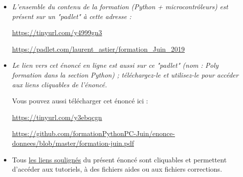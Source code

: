 \documentclass[11pt]{article}
\begin{document}
\begin{itemize}
 \item \textit{L'ensemble du contenu de la formation (Python + microcontrôleurs) est présent sur un "padlet" à cette adresse : }
 
 \smallskip
 \begin{center}
  \underline{\url{ https://tinyurl.com/y4999gn3}}\end{center}
  
  \smallskip
 
 \begin{center}
  \underline{\url{https://padlet.com/laurent\_astier/formation\_Juin\_2019}}
 \end{center}
 
 
 
 

 
 \bigskip
 
 
 
 
 
 

\item \textit{Le lien vers cet énoncé en ligne est aussi sur ce "padlet" (nom : Poly formation dans la section Python) ; téléchargez-le et utilisez-le pour accéder aux liens cliquables de l'énoncé.}

\medskip

Vous pouvez aussi télécharger cet énoncé ici : 

\smallskip

\begin{center}
\underline{\url{https://tinyurl.com/y3ebqcgn    }}
\end{center}


\smallskip

\begin{center}
\underline{\url{https://github.com/formationPythonPC-Juin/enonce-donnees/blob/master/formation-juin.pdf}                                                                                                  }
\end{center}






\bigskip








\item Tous \underline{les liens soulignés} du présent énoncé sont cliquables et permettent d'accéder aux tutoriels, à des fichiers aides ou aux fichiers corrections.







\end{itemize}
\end{document}
